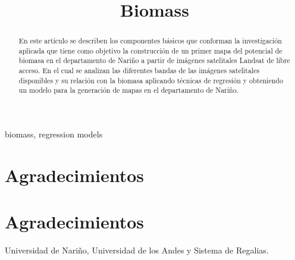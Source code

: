 \documentclass[conference]{IEEEtran}
\begin{document}
\pagestyle{empty}  


\title{Biomass}

\author{
\and
{}
}

\maketitle

\begin{abstract}

En este artículo se describen los componentes básicos que conforman
la investigación aplicada que tiene como objetivo la construcción de un
primer mapa del potencial de biomasa en el departamento de Nariño a
partir de imágenes satelitales Landsat de libre acceso. En el cual se 
analizan las diferentes bandas de las imágenes satelitales disponibles y
su relación con la biomasa aplicando técnicas de regresión y obteniendo un modelo
para la generación de mapas en el departamento de Nariño.

\end{abstract}
 


\begin{IEEEkeywords}
biomass, regression models 
\end{IEEEkeywords}

\thispagestyle{empty} 

\IEEEpeerreviewmaketitle










\ifCLASSOPTIONcompsoc
  \section*{Agradecimientos}
\else
  \section*{Agradecimientos}
\fi

Universidad de Nariño, Universidad de los Andes y Sistema de Regalias.

\ifCLASSOPTIONcaptionsoff
  \newpage
\fi





\end{document}
